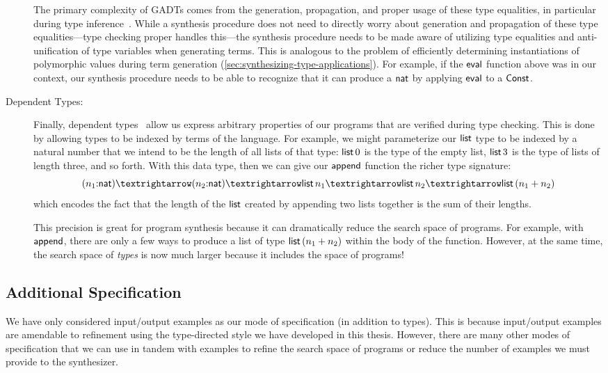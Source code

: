 \begin{description}
    The primary complexity of GADTs comes from the generation, propagation, and proper usage of these type equalities, in particular during type inference~\citep{peyton-jones-icfp-2006}.
    While a synthesis procedure does not need to directly worry about generation and propagation of these type equalities---type checking proper handles this---the synthesis procedure needs to be made aware of utilizing type equalities and anti-unification of type variables when generating terms.
    This is analogous to the problem of efficiently determining instantiations of polymorphic values during term generation (\autoref{sec:synthesizing-type-applications}).
    For example, if the $\mathsf{eval}$ function above was in our context, our synthesis procedure needs to be able to recognize that it can produce a $\mathsf{nat}$ by applying $\mathsf{eval}$ to a $\mathsf{Const}$.
  \item[Dependent Types:]
    Finally, dependent types~\citep{martin-lof-1984} allow us express arbitrary properties of our programs that are verified during type checking.
    This is done by allowing types to be indexed by terms of the language.
    For example, we might parameterize our $\mathsf{list}$ type to be indexed by a natural number that we intend to be the length of all lists of that type: $\mathsf{list}\,0$ is the type of the empty list, $\mathsf{list}\,3$ is the type of lists of length three, and so forth.
    With this data type, then we can give our $\mathsf{append}$ function the richer type signature:
    \[
      (n_1{:}\mnat) → (n_2{:}\mnat) → \mkwd{list}\,n_1 → \mkwd{list}\,n_2 → \mkwd{list}\,(n_1 + n_2)
    \]
    which encodes the fact that the length of the $\mathsf{list}$ created by appending two lists together is the sum of their lengths.

    This precision is great for program synthesis because it can dramatically reduce the search space of programs.
    For example, with $\mathsf{append}$, there are only a few ways to produce a list of type $\mathsf{list}\,(n_1 + n_2)$ within the body of the function.
    However, at the same time, the search space of \emph{types} is now much larger because it includes the space of programs!
\end{description}

\subsection{Additional Specification}
\label{subsec:additional-specification}

We have only considered input/output examples as our mode of specification (in addition to types).
This is because input/output examples are amendable to refinement using the type-directed style we have developed in this thesis.
However, there are many other modes of specification that we can use in tandem with examples to refine the search space of programs or reduce the number of examples we must provide to the synthesizer.

